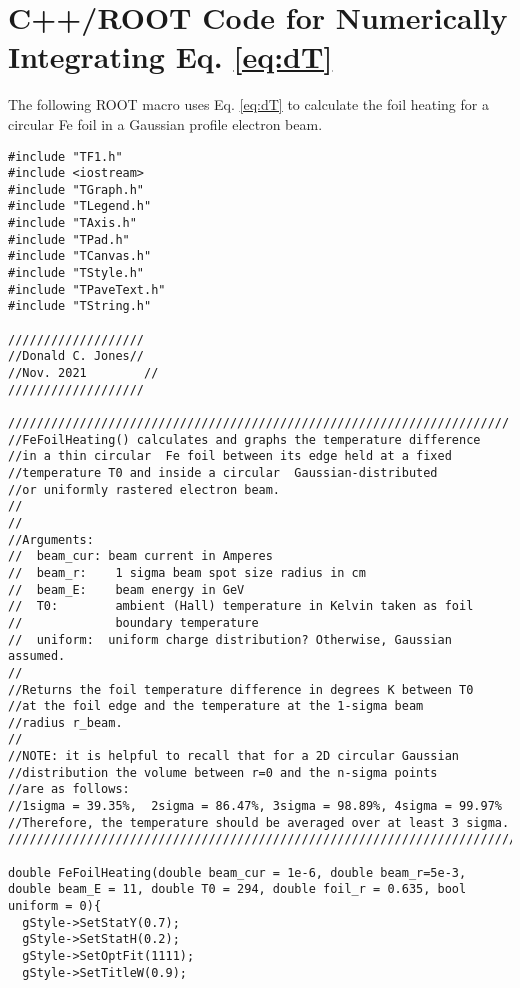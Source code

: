 \documentclass[12pt]{article}
\begin{document}
\section{C++/ROOT Code for Numerically Integrating Eq. \ref{eq:dT}}
The following ROOT macro uses Eq. \ref{eq:dT} to calculate the foil heating for a circular Fe foil in a Gaussian profile electron beam.
\begin{lstlisting}
#include "TF1.h"
#include <iostream>
#include "TGraph.h"
#include "TLegend.h"
#include "TAxis.h"
#include "TPad.h"
#include "TCanvas.h"
#include "TStyle.h"
#include "TPaveText.h"
#include "TString.h"

///////////////////
//Donald C. Jones//
//Nov. 2021        //
///////////////////

//////////////////////////////////////////////////////////////////////
//FeFoilHeating() calculates and graphs the temperature difference 
//in a thin circular  Fe foil between its edge held at a fixed 
//temperature T0 and inside a circular  Gaussian-distributed 
//or uniformly rastered electron beam.                                                 
//     
//                                                                               
//Arguments:                                                                         
//  beam_cur: beam current in Amperes                                                
//  beam_r:    1 sigma beam spot size radius in cm                                    
//  beam_E:    beam energy in GeV                                                      
//  T0:        ambient (Hall) temperature in Kelvin taken as foil 
//             boundary temperature 
//  uniform:  uniform charge distribution? Otherwise, Gaussian assumed. 
//                                                                         
//Returns the foil temperature difference in degrees K between T0
//at the foil edge and the temperature at the 1-sigma beam 
//radius r_beam.       
//                       
//NOTE: it is helpful to recall that for a 2D circular Gaussian 
//distribution the volume between r=0 and the n-sigma points 
//are as follows:                           
//1sigma = 39.35%,  2sigma = 86.47%, 3sigma = 98.89%, 4sigma = 99.97%
//Therefore, the temperature should be averaged over at least 3 sigma.    
/////////////////////////////////////////////////////////////////////////

double FeFoilHeating(double beam_cur = 1e-6, double beam_r=5e-3, double beam_E = 11, double T0 = 294, double foil_r = 0.635, bool uniform = 0){
  gStyle->SetStatY(0.7);
  gStyle->SetStatH(0.2);
  gStyle->SetOptFit(1111);
  gStyle->SetTitleW(0.9);


\end{lstlisting}
\end{document}
